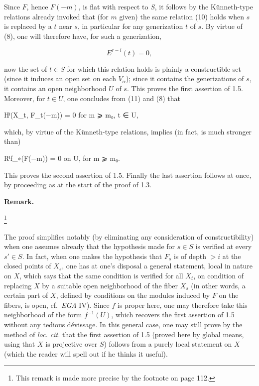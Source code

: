 \documentclass[
  11pt,
  a4paper,
]{book}
\newenvironment{Shaded}{}{}
\newcommand{\NormalTok}[1]{#1}
\begin{document}
Since \(F\), hence \(F(-m)\), is flat with respect to \(S\), it follows
by the Künneth-type relations already invoked that (for \(m\) given) the
same relation (10) holds when \(s\) is replaced by a \(t\) near \(s\),
in particular for any generization \(t\) of \(s\). By virtue of (8), one
will therefore have, for such a generization,

\[ E^{r-i}(t) = 0, \]

now the set of \(t \in S\) for which this relation holds is plainly a
constructible set (since it induces an open set on each \(V_{\alpha}\));
since it contains the generizations of \(s\), it contains an open
neighborhood \(U\) of \(s\). This proves the first assertion of 1.5.
Moreover, for \(t \in U\), one concludes from (11) and (8) that

\begin{Shaded}
\begin{Highlighting}[]
\NormalTok{Hⁱ(X\_t, F\_t(−m)) = 0 for m ⩾ m₀, t ∈ U,}
\end{Highlighting}
\end{Shaded}

which, by virtue of the Künneth-type relations, implies (in fact, is
much stronger than)

\begin{Shaded}
\begin{Highlighting}[]
\NormalTok{Rⁱf\_∗(F(−m)) = 0 on U, for m ⩾ m₀.}
\end{Highlighting}
\end{Shaded}

This proves the second assertion of 1.5. Finally the last assertion
follows at once, by proceeding as at the start of the proof of 1.3.

\textbf{Remark.}

\footnote{This remark is made more precise by the footnote on page 112.}

The proof simplifies notably (by eliminating any consideration of
constructibility) when one assumes already that the hypothesis made for
\(s \in S\) is verified at every \(s' \in S\). In fact, when one makes
the hypothesis that \(F_{s}\) is of depth \(> i\) at the closed points
of \(X_{s}\), one has at one's disposal a general statement, local in
nature on \(X\), which says that the same condition is verified for all
\(X_{t}\), on condition of replacing \(X\) by a suitable open
neighborhood of the fiber \(X_{s}\) (in other words, a certain part of
\(X\), defined by conditions on the modules induced by \(F\) on the
fibers, is open, cf.~\emph{EGA} IV). Since \(f\) is proper here, one may
therefore take this neighborhood of the form \(f^{-1}(U)\), which
recovers the first assertion of 1.5 without any tedious dévissage. In
this general case, one may still prove by the method of \emph{loc. cit.}
that the first assertion of 1.5 (proved here by global means, using that
\(X\) is projective over \(S\)) follows from a purely local statement on
\(X\) (which the reader will spell out if he thinks it useful).
\end{document}
